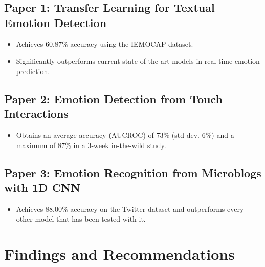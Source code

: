 \documentclass[12pt]{article} %
\begin{document}
\subsection*{Paper 1: Transfer Learning for Textual Emotion Detection}
\begin{itemize}
  \item Achieves 60.87\% accuracy using the IEMOCAP dataset.
  \item Significantly outperforms current state-of-the-art models in real-time emotion prediction.
\end{itemize}  

\subsection*{Paper 2: Emotion Detection from Touch Interactions}
\begin{itemize}
  \item Obtains an average accuracy (AUCROC) of 73\% (std dev. 6\%) and a maximum of 87\% in a 3-week in-the-wild study.
\end{itemize}

\subsection*{Paper 3: Emotion Recognition from Microblogs with 1D CNN}
\begin{itemize}
  \item Achieves 88.00\% accuracy on the Twitter dataset and outperforms every other model that has been tested with it.
\end{itemize}


\section{Findings and Recommendations}
\end{document}

